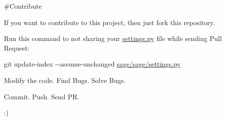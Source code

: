 \#\+Contribute

If you want to contribute to this project, then just fork this repository.


\begin{DoxyItemize}
\item Run this command to not sharing your \hyperlink{a00022}{settings.\+py} file while sending Pull Request\+:
\end{DoxyItemize}

{\ttfamily git update-\/index -\/-\/assume-\/unchanged \hyperlink{a00022}{sage/sage/settings.\+py}}


\begin{DoxyItemize}
\item Modify the code. Find Bugs. Solve Bugs.
\item Commit. Push. Send P\+R.
\end{DoxyItemize}

\+:) 